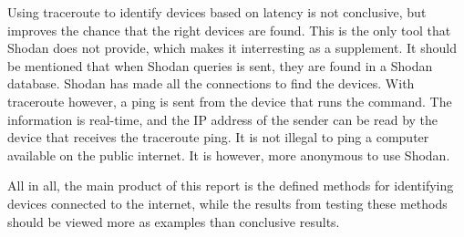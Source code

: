 Using traceroute to identify devices based on latency is not conclusive, but improves the chance that the right devices are found. This is the only tool that Shodan does not provide, which makes it interresting as a supplement. It should be mentioned that when Shodan queries is sent, they are found in a Shodan database. Shodan has made all the connections to find the devices. With traceroute however, a ping is sent from the device that runs the command. The information is real-time, and the IP address of the sender can be read by the device that receives the traceroute ping. It is not illegal to ping a computer available on the public internet. It is however, more anonymous to use Shodan. 

All in all, the main product of this report is the defined methods for identifying devices connected to the internet, while the results from testing these methods should be viewed more as examples than conclusive results. 
